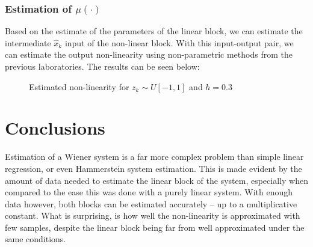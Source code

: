 \clearpage
\subsubsection{Estimation of $\mu(\cdot)$}
Based on the estimate of the parameters of the linear block, we can estimate the intermediate $\hat{x}_k$  input of the non-linear block. With this input-output pair, we can estimate the output non-linearity using non-parametric methods from the previous laboratories. The results can be seen below:\\
 
\begin{figure}[h!]
\begin{center}

\caption{Estimated non-linearity for $z_k \sim U[-1,1]$ and  $h = 0.3$}
\end{center}
\end{figure}




\section{Conclusions}
Estimation of a Wiener system is a far more complex problem than simple linear regression, or even Hammerstein system estimation. This is made evident by the amount of data needed to estimate the linear block of the system, especially when compared to the ease this was done with a purely linear system. With enough data however, both blocks can be estimated accurately -- up to a multiplicative constant. What is surprising, is how well the non-linearity is approximated with few samples, despite the linear block being far from well approximated under the same conditions.


